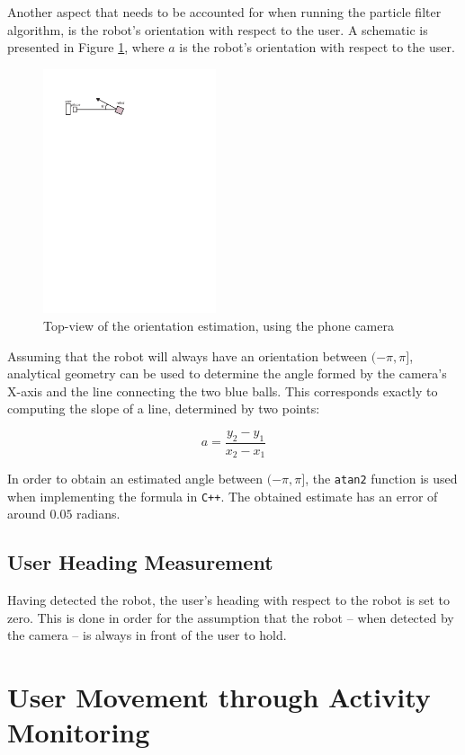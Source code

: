 \documentclass[journal]{IEEEtran}
\let\MYoriglatexcaption\caption
\renewcommand{\caption}[2][\relax]{\MYoriglatexcaption[#2]{#2}}
\begin{document}
Another aspect that needs to be accounted for when running the particle filter algorithm, is the robot's orientation with respect to the user. A schematic is presented in Figure \ref{fig:orient_camera}, where $a$ is the robot's orientation with respect to the user.
%
\begin{figure}[htpb]
 \centering
\includegraphics[width=2in]{images/orientation_meas}
\caption{Top-view of the orientation estimation, using the phone camera}
\label{fig:orient_camera}
\end{figure}
%
Assuming that the robot will always have an orientation between $(-\pi, \pi]$, analytical geometry can be used to determine the angle formed by the camera's X-axis and the line connecting the two blue balls. This corresponds exactly to computing the slope of a line, determined by two points:

\begin{equation}
a=\frac{y_2-y_1}{x_2-x_1}
\end{equation}

In order to obtain an estimated angle between $(-\pi, \pi]$, the \texttt{atan2} function is used when implementing the formula in \texttt{C++}. The obtained estimate has an error of around $0.05$ radians.

\subsection{User Heading Measurement}
Having detected the robot, the user's heading with respect to the robot is set to zero. This is done in order for the assumption that the robot -- when detected by the camera -- is always in front of the user to hold.

\section{User Movement through Activity Monitoring}
\end{document}
